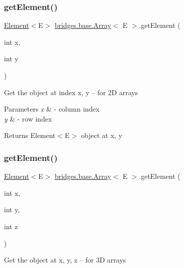 \subsubsection{\texorpdfstring{get\+Element()}{getElement()}\hspace{0.1cm}{\footnotesize\ttfamily [2/3]}}
{\footnotesize\ttfamily \mbox{\hyperlink{classbridges_1_1base_1_1_element}{Element}}$<$E$>$ \mbox{\hyperlink{classbridges_1_1base_1_1_array}{bridges.\+base.\+Array}}$<$ E $>$.get\+Element (\begin{DoxyParamCaption}\item[{int}]{x,  }\item[{int}]{y }\end{DoxyParamCaption})}

Get the object at index x, y -- for 2D arrays


\begin{DoxyParams}{Parameters}
{\em x} & -\/ column index \\
\hline
{\em y} & -\/ row index \\
\hline
\end{DoxyParams}
\begin{DoxyReturn}{Returns}
Element$<$\+E$>$ object at x, y 
\end{DoxyReturn}
\mbox{\label{classbridges_1_1base_1_1_array_a09b5bd2d3b4cd12aea34b5e62b5e801a}} 
\subsubsection{\texorpdfstring{get\+Element()}{getElement()}\hspace{0.1cm}{\footnotesize\ttfamily [3/3]}}
{\footnotesize\ttfamily \mbox{\hyperlink{classbridges_1_1base_1_1_element}{Element}}$<$E$>$ \mbox{\hyperlink{classbridges_1_1base_1_1_array}{bridges.\+base.\+Array}}$<$ E $>$.get\+Element (\begin{DoxyParamCaption}\item[{int}]{x,  }\item[{int}]{y,  }\item[{int}]{z }\end{DoxyParamCaption})}

Get the object at x, y, z -- for 3D arrays


